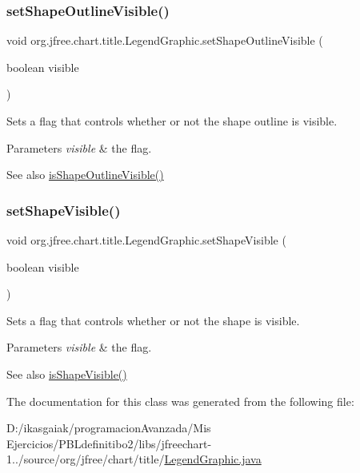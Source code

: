 \subsubsection{\texorpdfstring{set\+Shape\+Outline\+Visible()}{setShapeOutlineVisible()}}
{\footnotesize\ttfamily void org.\+jfree.\+chart.\+title.\+Legend\+Graphic.\+set\+Shape\+Outline\+Visible (\begin{DoxyParamCaption}\item[{boolean}]{visible }\end{DoxyParamCaption})}

Sets a flag that controls whether or not the shape outline is visible.


\begin{DoxyParams}{Parameters}
{\em visible} & the flag.\\
\hline
\end{DoxyParams}
\begin{DoxySeeAlso}{See also}
\mbox{\hyperlink{classorg_1_1jfree_1_1chart_1_1title_1_1_legend_graphic_afb3dad5bedac047e7a37b67ff0778322}{is\+Shape\+Outline\+Visible()}} 
\end{DoxySeeAlso}
\mbox{\label{classorg_1_1jfree_1_1chart_1_1title_1_1_legend_graphic_a9e9b25b9ffb71d4945bf4f873b74bb26}} 
\subsubsection{\texorpdfstring{set\+Shape\+Visible()}{setShapeVisible()}}
{\footnotesize\ttfamily void org.\+jfree.\+chart.\+title.\+Legend\+Graphic.\+set\+Shape\+Visible (\begin{DoxyParamCaption}\item[{boolean}]{visible }\end{DoxyParamCaption})}

Sets a flag that controls whether or not the shape is visible.


\begin{DoxyParams}{Parameters}
{\em visible} & the flag.\\
\hline
\end{DoxyParams}
\begin{DoxySeeAlso}{See also}
\mbox{\hyperlink{classorg_1_1jfree_1_1chart_1_1title_1_1_legend_graphic_adce25f6b685e2135236b4cdf0e555a43}{is\+Shape\+Visible()}} 
\end{DoxySeeAlso}


The documentation for this class was generated from the following file\+:\begin{DoxyCompactItemize}
\item 
D\+:/ikasgaiak/programacion\+Avanzada/\+Mis Ejercicios/\+P\+B\+Ldefinitibo2/libs/jfreechart-\/1../source/org/jfree/chart/title/\mbox{\hyperlink{_legend_graphic_8java}{Legend\+Graphic.\+java}}\end{DoxyCompactItemize}

